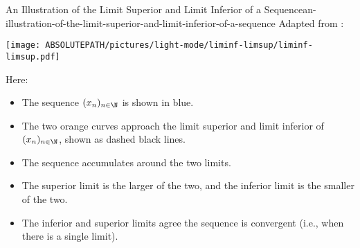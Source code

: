 \begin{remark}{An Illustration of the Limit Superior and Limit Inferior of a Sequence}{an-illustration-of-the-limit-superior-and-limit-inferior-of-a-sequence}%
    Adapted from \cite{wikipedia:limit-superior-and-limit-inferior}:
    \begin{webcompile}%
        \texttt{[image: ABSOLUTEPATH/pictures/light-mode/liminf-limsup/liminf-limsup.pdf]}%
    \end{webcompile}%
    Here:
    \begin{itemize}
        \item The sequence $(x_{n})_{n\in\N}$ is shown in \textcolor{OIblue}{blue}.
        \item The two \textcolor{OIvermillion}{orange} curves approach the limit superior and limit inferior of $(x_{n})_{n\in\N}$, shown as dashed black lines.
        \item The sequence accumulates around the two limits.
        \item The superior limit is the larger of the two, and the inferior limit is the smaller of the two.
        \item The inferior and superior limits agree \textiff the sequence is convergent (i.e., when there is a single limit).
    \end{itemize}
\end{remark}
